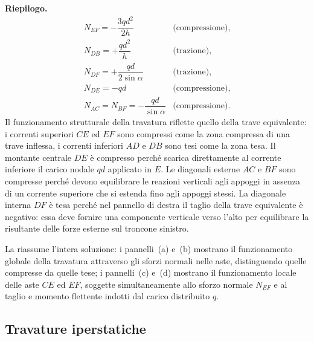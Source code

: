 \begin{esempio}
\begin{svolgimento}
		\noindent\textbf{Riepilogo.}
		\[
		\begin{array}{ll}
			N_{EF} = -\dfrac{3qd^2}{2h} & \text{(compressione)}, \\[8pt]
			N_{DB} = +\dfrac{qd^2}{h}   & \text{(trazione)}, \\[8pt]
			N_{DF} = +\dfrac{qd}{2\sin\alpha} & \text{(trazione)}, \\[8pt]
			N_{DE} = -qd & \text{(compressione)}, \\[8pt]
			N_{AC} = N_{BF} = -\dfrac{qd}{\sin\alpha} & \text{(compressione)}.
		\end{array}
		\]
		Il funzionamento strutturale della travatura riflette
		quello della trave equivalente: i correnti superiori
		$CE$ ed $EF$ sono compressi come la zona compressa
		di una trave inflessa, i correnti inferiori $AD$ e
		$DB$ sono tesi come la zona tesa. Il montante centrale
		$DE$ è compresso perché scarica direttamente al corrente
		inferiore il carico nodale $qd$ applicato in $E$.
		Le diagonali esterne $AC$ e $BF$ sono compresse perché
		devono equilibrare le reazioni verticali agli appoggi
		in assenza di un corrente superiore che si estenda
		fino agli appoggi stessi. La diagonale interna $DF$
		è tesa perché nel pannello di destra il taglio della
		trave equivalente è negativo: essa deve fornire una
		componente verticale verso l'alto per equilibrare
		la risultante delle forze esterne sul troncone sinistro.
		
		La  riassume
		l'intera soluzione: i pannelli~(a) e~(b) mostrano
		il funzionamento globale della travatura attraverso
		gli sforzi normali nelle aste, distinguendo quelle
		compresse da quelle tese; i pannelli~(c) e~(d)
		mostrano il funzionamento locale delle aste $CE$
		ed $EF$, soggette simultaneamente allo sforzo
		normale $N_{EF}$ e al taglio e momento flettente
		indotti dal carico distribuito $q$.	
	\end{svolgimento}
\end{esempio}



\subsection{Travature iperstatiche}
\label{sec:reticolari_iperstat}

